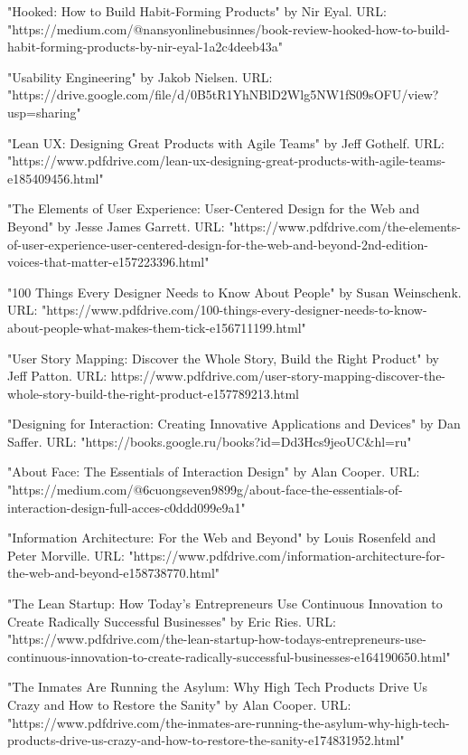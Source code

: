 \documentclass{article}
\begin{document}
"Hooked: How to Build Habit-Forming Products" by Nir Eyal. URL: "https://medium.com/@nansyonlinebusinnes/book-review-hooked-how-to-build-habit-forming-products-by-nir-eyal-1a2c4deeb43a"

"Usability Engineering" by Jakob Nielsen. URL: "https://drive.google.com/file/d/0B5tR1YhNBlD2Wlg5NW1fS09sOFU/view?usp=sharing"

"Lean UX: Designing Great Products with Agile Teams" by Jeff Gothelf. URL:
"https://www.pdfdrive.com/lean-ux-designing-great-products-with-agile-teams-e185409456.html"

"The Elements of User Experience: User-Centered Design for the Web and Beyond" by Jesse James Garrett. URL: "https://www.pdfdrive.com/the-elements-of-user-experience-user-centered-design-for-the-web-and-beyond-2nd-edition-voices-that-matter-e157223396.html"

"100 Things Every Designer Needs to Know About People" by Susan Weinschenk. URL: "https://www.pdfdrive.com/100-things-every-designer-needs-to-know-about-people-what-makes-them-tick-e156711199.html"

"User Story Mapping: Discover the Whole Story, Build the Right Product" by Jeff Patton. URL: https://www.pdfdrive.com/user-story-mapping-discover-the-whole-story-build-the-right-product-e157789213.html

"Designing for Interaction: Creating Innovative Applications and Devices" by Dan Saffer. URL: "https://books.google.ru/books?id=Dd3Hcs9jeoUC&hl=ru"

"About Face: The Essentials of Interaction Design" by Alan Cooper. URL: "https://medium.com/@6cuongseven9899g/about-face-the-essentials-of-interaction-design-full-acces-c0ddd099e9a1"

"Information Architecture: For the Web and Beyond" by Louis Rosenfeld and Peter Morville. URL: "https://www.pdfdrive.com/information-architecture-for-the-web-and-beyond-e158738770.html"

"The Lean Startup: How Today's Entrepreneurs Use Continuous Innovation to Create Radically Successful Businesses" by Eric Ries. URL:
"https://www.pdfdrive.com/the-lean-startup-how-todays-entrepreneurs-use-continuous-innovation-to-create-radically-successful-businesses-e164190650.html"

"The Inmates Are Running the Asylum: Why High Tech Products Drive Us Crazy and How to Restore the Sanity" by Alan Cooper. URL: "https://www.pdfdrive.com/the-inmates-are-running-the-asylum-why-high-tech-products-drive-us-crazy-and-how-to-restore-the-sanity-e174831952.html"
\end{document}

